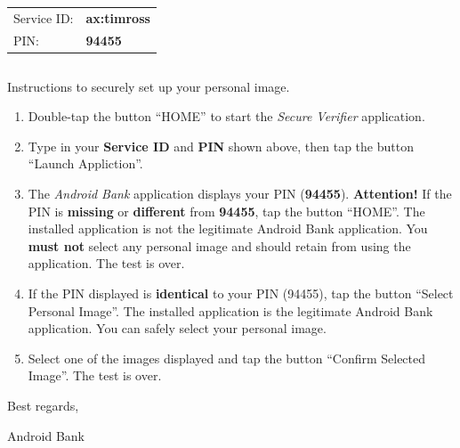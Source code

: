 \begin{center}
{\tabulinesep=2mm
\setlength{\tabcolsep}{5mm}
\begin{tabu}{|ll|}
\hline
Service ID:     & \textbf{ax:timross}\\
PIN:            & \textbf{94455}\\
\hline
\end{tabu}}
\end{center}

\centering
\begin{tabular}{|ll|}

\end{tabular}


\noindent Instructions to securely set up your personal image.\\


\begin{enumerate}
\item Double-tap the button ``HOME'' to start the \emph{Secure Verifier} application.
\item Type in your \textbf{Service ID} and \textbf{PIN} shown above, then tap the button ``Launch Appliction''.
\item The \emph{Android Bank} application displays your PIN (\textbf{94455}). 
        \textbf{Attention!} If the PIN is \textbf{missing} or \textbf{different} from \textbf{94455}, tap the button ``HOME''.
      The installed application is not the legitimate Android Bank application.
      You \textbf{must not} select any personal image and should retain from using the application. The test is over.
\item If the PIN displayed is \textbf{identical} to your PIN (94455), tap the button ``Select Personal Image''.
        The installed application is the legitimate Android Bank application. You can safely select your personal image.
\item Select one of the images displayed and tap the button ``Confirm Selected Image''. The test is over.
\end{enumerate}

\bigskip

\hspace{8cm} Best regards,

\hspace{8.5cm} Android Bank

